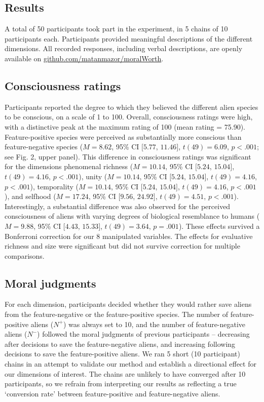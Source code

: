 \documentclass[10pt, letterpaper]{article}
\begin{document}
\hypertarget{results}{%
\subsection{Results}\label{results}}

A total of 50 participants took part in the experiment, in 5 chains of
10 participants each. Participants provided meaningful descriptions of
the different dimensions. All recorded responses, including verbal
descriptions, are openly available on
\url{github.com/matanmazor/moralWorth}.

\hypertarget{consciousness-ratings}{%
\subsection{Consciousness ratings}\label{consciousness-ratings}}

Participants reported the degree to which they believed the different
alien species to be conscious, on a scale of 1 to 100. Overall,
consciousness ratings were high, with a distinctive peak at the maximum
rating of 100 (mean rating = 75.90). Feature-positive species were
perceived as substantially more conscious than feature-negative species
(\(M = 8.62\), 95\% CI \([5.77\), \(11.46]\), \(t(49) = 6.09\),
\(p < .001\); see Fig. 2, upper panel). This difference in consciousness
ratings was significant for the dimensions phenomenal richness
(\(M = 10.14\), 95\% CI \([5.24\), \(15.04]\), \(t(49) = 4.16\),
\(p < .001\)), unity (\(M = 10.14\), 95\% CI \([5.24\), \(15.04]\),
\(t(49) = 4.16\), \(p < .001\)), temporality (\(M = 10.14\), 95\% CI
\([5.24\), \(15.04]\), \(t(49) = 4.16\), \(p < .001\)), and selfhood
(\(M = 17.24\), 95\% CI \([9.56\), \(24.92]\), \(t(49) = 4.51\),
\(p < .001\)). Interestingly, a substantial difference was also observed
for the perceived consciousness of aliens with varying degrees of
biological resemblance to humans (\(M = 9.88\), 95\% CI \([4.43\),
\(15.33]\), \(t(49) = 3.64\), \(p = .001\)). These effects survived a
Bonferroni correction for our 8 manipulated variables. The effects for
evaluative richness and size were significant but did not survive
correction for multiple comparisons.

\hypertarget{moral-judgments}{%
\subsection{Moral judgments}\label{moral-judgments}}

For each dimension, participants decided whether they would rather save
aliens from the feature-negative or the feature-positive species. The
number of feature-positive aliens (\(N^+\)) was always set to 10, and
the number of feature-negative aliens (\(N^-\)) followed the moral
judgments of previous participants -- decreasing after decisions to save
the feature-negative aliens, and increasing following decisions to save
the feature-positive aliens. We ran 5 short (10 participant) chains in
an attempt to validate our method and establish a directional effect for
our dimensions of interest. The chains are unlikely to have converged
after 10 participants, so we refrain from interpreting our results as
reflecting a true `conversion rate' between feature-positive and
feature-negative aliens.
\end{document}
